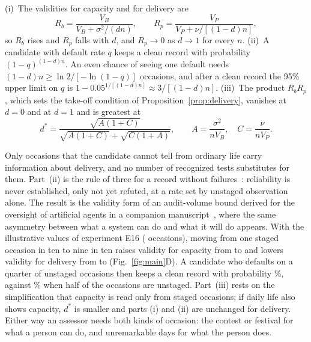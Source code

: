 \begin{proposition}\label{prop:staging}
(i)~The validities for capacity and for delivery are
\begin{equation}
R_b=\frac{V_B}{V_B+\sigma^2/(dn)},\qquad R_p=\frac{V_P}{V_P+\nu/[(1-d)n]},\label{eq:staging}
\end{equation}
so $R_b$ rises and $R_p$ falls with $d$, and $R_p\to0$ as $d\to1$ for every $n$. (ii)~A candidate with default rate $q$
keeps a clean record with probability $(1-q)^{(1-d)n}$. An even chance of seeing one default needs
$(1-d)n\ge\ln2/[-\ln(1-q)]$ occasions, and after a clean record the 95\% upper limit on $q$ is
$1-0.05^{1/[(1-d)n]}\approx3/[(1-d)n]$. (iii)~The product $R_bR_p$, which sets the take-off condition of
Proposition~\ref{prop:delivery}, vanishes at $d=0$ and at $d=1$ and is greatest at
\begin{equation}
d^*=\frac{\sqrt{A(1+C)}}{\sqrt{A(1+C)}+\sqrt{C(1+A)}},\qquad A=\frac{\sigma^2}{nV_B},\quad C=\frac{\nu}{nV_P}.\label{eq:dstar}
\end{equation}
\end{proposition}

Only occasions that the candidate cannot tell from ordinary life carry information about delivery, and no number of
recognized tests substitutes for them. Part~(ii) is the rule of three for a record without failures~\cite{hanley1983}:
reliability is never established, only not yet refuted, at a rate set by unstaged observation alone. The result is the
validity form of an audit-volume bound derived for the oversight of artificial agents in a companion
manuscript~\cite{taylor2026iina}, where the same asymmetry between what a system can do and what it will do appears. With
the illustrative values of experiment E16 (\VerN{} occasions), moving from one staged occasion in ten to nine in ten raises
validity for capacity from \VerRbLo{} to \VerRbHi{} and lowers validity for delivery from \VerRpLo{} to \VerRpHi{}
(Fig.~\ref{fig:main}D). A candidate who defaults on a quarter of unstaged occasions then keeps a clean record with
probability \VerCleanNine\%, against \VerCleanHalf\% when half of the occasions are unstaged. Part~(iii) rests on the
simplification that capacity is read only from staged occasions; if daily life also shows capacity, $d^*$ is smaller and
parts (i) and (ii) are unchanged for delivery. Either way an assessor needs both kinds of occasion: the contest or festival
for what a person can do, and unremarkable days for what the person does.

